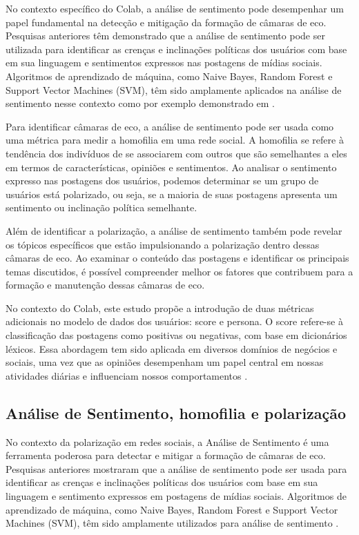 No contexto específico do Colab, a análise de sentimento pode desempenhar um papel fundamental na detecção e mitigação da formação de câmaras de eco. Pesquisas anteriores têm demonstrado que a análise de sentimento pode ser utilizada para identificar as crenças e inclinações políticas dos usuários com base em sua linguagem e sentimentos expressos nas postagens de mídias sociais. Algoritmos de aprendizado de máquina, como Naive Bayes, Random Forest e Support Vector Machines (SVM), têm sido amplamente aplicados na análise de sentimento nesse contexto como por exemplo demonstrado em .

Para identificar câmaras de eco, a análise de sentimento pode ser usada como uma métrica para medir a homofilia em uma rede social. A homofilia se refere à tendência dos indivíduos de se associarem com outros que são semelhantes a eles em termos de características, opiniões e sentimentos. Ao analisar o sentimento expresso nas postagens dos usuários, podemos determinar se um grupo de usuários está polarizado, ou seja, se a maioria de suas postagens apresenta um sentimento ou inclinação política semelhante.

Além de identificar a polarização, a análise de sentimento também pode revelar os tópicos específicos que estão impulsionando a polarização dentro dessas câmaras de eco. Ao examinar o conteúdo das postagens e identificar os principais temas discutidos, é possível compreender melhor os fatores que contribuem para a formação e manutenção dessas câmaras de eco.

No contexto do Colab, este estudo propõe a introdução de duas métricas adicionais no modelo de dados dos usuários: score e persona. O score refere-se à classificação das postagens como positivas ou negativas, com base em dicionários léxicos. Essa abordagem tem sido aplicada em diversos domínios de negócios e sociais, uma vez que as opiniões desempenham um papel central em nossas atividades diárias e influenciam nossos comportamentos \cite{2012_Souza_IP}.

\subsection*{Análise de Sentimento, homofilia e polarização}

No contexto da polarização em redes sociais, a Análise de Sentimento é uma ferramenta poderosa para detectar e mitigar a formação de câmaras de eco. Pesquisas anteriores mostraram que a análise de sentimento pode ser usada para identificar as crenças e inclinações políticas dos usuários com base em sua linguagem e sentimento expressos em postagens de mídias sociais. Algoritmos de aprendizado de máquina, como Naive Bayes, Random Forest e Support Vector Machines (SVM), têm sido amplamente utilizados para análise de sentimento \cite{2014_Hutto}.

